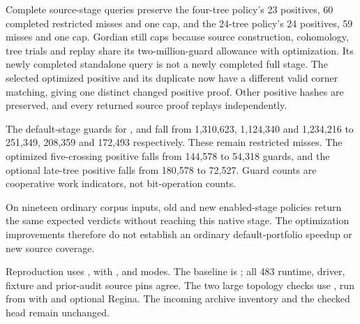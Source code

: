 Complete source-stage queries preserve the four-tree policy's 23 positives,
60 completed restricted misses and one cap, and the 24-tree policy's 24
positives, 59 misses and one cap. Gordian still caps because source
construction, cohomology, tree trials and replay share its two-million-guard
allowance with optimization. Its newly completed standalone query is not
a newly completed full stage. The selected optimized positive and its
duplicate  now have a different valid corner matching,
giving one distinct changed positive proof. Other positive hashes are
preserved, and every returned source proof replays independently.

The default-stage guards for ,  and
 fall from 1,310,623, 1,124,340 and 1,234,216 to
251,349, 208,359 and 172,493 respectively. These remain restricted misses.
The optimized five-crossing positive falls from 144,578 to 54,318 guards,
and the optional late-tree positive falls from 180,578 to 72,527. Guard
counts are cooperative work indicators, not bit-operation counts.

On nineteen ordinary corpus inputs, old and new enabled-stage policies
return the same expected verdicts without reaching this native stage.
The optimization improvements therefore do not establish an ordinary
default-portfolio speedup or new source coverage.



Reproduction uses , with
,  and  modes. The baseline
is ; all 483 runtime, driver, fixture and prior-audit
source pins agree. The two large topology checks use
, run from  with
 and optional Regina. The incoming archive inventory
and the checked  head  remain unchanged.
